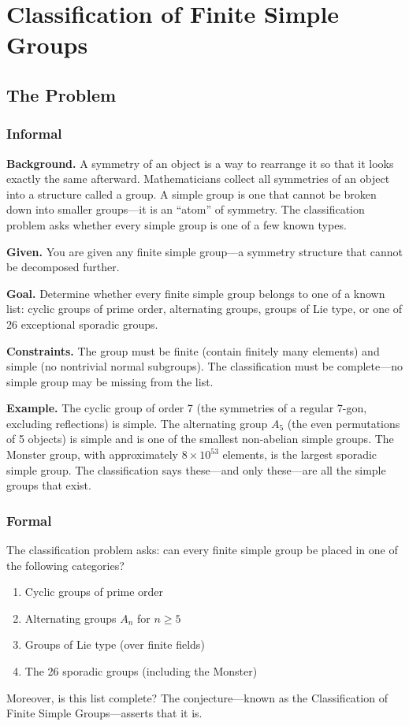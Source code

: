 \let\LocalMacro\relax

\chapter{Classification of Finite Simple Groups}

\section{The Problem}

\subsection{Informal}

\textbf{Background.} A symmetry of an object is a way to rearrange it so that it looks exactly the same afterward. Mathematicians collect all symmetries of an object into a structure called a group. A simple group is one that cannot be broken down into smaller groups---it is an ``atom'' of symmetry. The classification problem asks whether every simple group is one of a few known types.

\textbf{Given.} You are given any finite simple group---a symmetry structure that cannot be decomposed further.

\textbf{Goal.} Determine whether every finite simple group belongs to one of a known list: cyclic groups of prime order, alternating groups, groups of Lie type, or one of 26 exceptional sporadic groups.

\textbf{Constraints.} The group must be finite (contain finitely many elements) and simple (no nontrivial normal subgroups). The classification must be complete---no simple group may be missing from the list.

\textbf{Example.} The cyclic group of order 7 (the symmetries of a regular 7-gon, excluding reflections) is simple. The alternating group $A_5$ (the even permutations of 5 objects) is simple and is one of the smallest non-abelian simple groups. The Monster group, with approximately $8 \times 10^{53}$ elements, is the largest sporadic simple group. The classification says these---and only these---are all the simple groups that exist.

\subsection{Formal}

The classification problem asks: can every finite simple group be placed in one of the following categories?
\begin{enumerate}
\item Cyclic groups of prime order
\item Alternating groups $A_n$ for $n \geq 5$
\item Groups of Lie type (over finite fields)
\item The 26 sporadic groups (including the Monster)
\end{enumerate}
Moreover, is this list complete? The conjecture---known as the Classification of Finite Simple Groups---asserts that it is.

